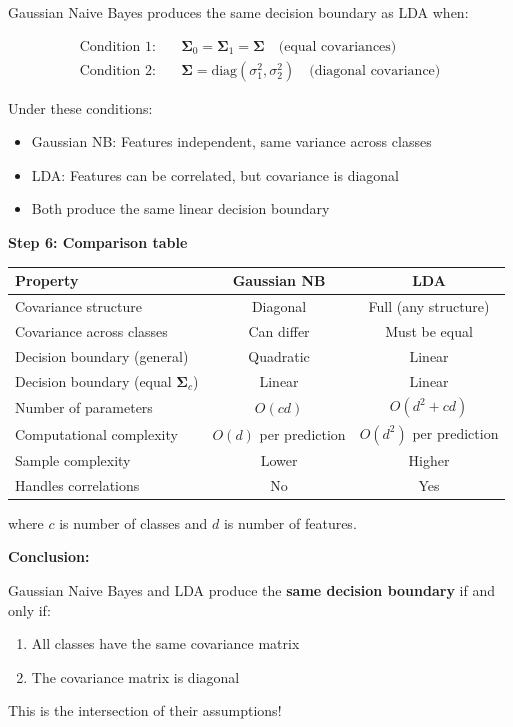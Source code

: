 \documentclass[12pt]{article}
\begin{document}
\begin{solution}
Gaussian Naive Bayes produces the same decision boundary as LDA when:

\[
\boxed{
\begin{aligned}
\text{Condition 1:} &\quad \boldsymbol{\Sigma}_0 = \boldsymbol{\Sigma}_1 = \boldsymbol{\Sigma} \quad \text{(equal covariances)} \\
\text{Condition 2:} &\quad \boldsymbol{\Sigma} = \text{diag}(\sigma_1^2, \sigma_2^2) \quad \text{(diagonal covariance)}
\end{aligned}
}
\]

Under these conditions:
\begin{itemize}
    \item Gaussian NB: Features independent, same variance across classes
    \item LDA: Features can be correlated, but covariance is diagonal
    \item Both produce the same linear decision boundary
\end{itemize}

\textbf{Step 6: Comparison table}

\begin{center}
\begin{tabular}{|l|c|c|}
\hline
\textbf{Property} & \textbf{Gaussian NB} & \textbf{LDA} \\
\hline
Covariance structure & Diagonal & Full (any structure) \\
Covariance across classes & Can differ & Must be equal \\
Decision boundary (general) & Quadratic & Linear \\
Decision boundary (equal $\boldsymbol{\Sigma}_c$) & Linear & Linear \\
Number of parameters & $O(cd)$ & $O(d^2 + cd)$ \\
Computational complexity & $O(d)$ per prediction & $O(d^2)$ per prediction \\
Sample complexity & Lower & Higher \\
Handles correlations & No & Yes \\
\hline
\end{tabular}
\end{center}

where $c$ is number of classes and $d$ is number of features.

\textbf{Conclusion:}

Gaussian Naive Bayes and LDA produce the \textbf{same decision boundary} if and only if:
\begin{enumerate}
    \item All classes have the same covariance matrix
    \item The covariance matrix is diagonal
\end{enumerate}

This is the intersection of their assumptions!
\end{solution}
\end{document}
